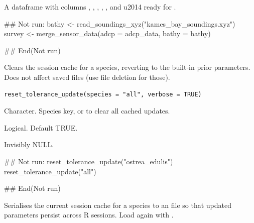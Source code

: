 \documentclass[a4paper]{book}
\begin{document}
%
\begin{Value}
A dataframe with columns , , , ,
, and  \bsl{}u2014 ready for .
\end{Value}
%
\begin{Examples}
\begin{ExampleCode}
## Not run: 
bathy <- read_soundings_xyz("kames_bay_soundings.xyz")
survey <- merge_sensor_data(adcp = adcp_data, bathy = bathy)

## End(Not run)
\end{ExampleCode}
\end{Examples}
%
\begin{Description}
Clears the session cache for a species, reverting to the built-in prior
parameters. Does not affect saved files (use file deletion for those).
\end{Description}
%
\begin{Usage}
\begin{verbatim}
reset_tolerance_update(species = "all", verbose = TRUE)
\end{verbatim}
\end{Usage}
%
\begin{Arguments}
\begin{ldescription}
\item[\code{species}] Character. Species key, or  to clear all cached updates.

\item[\code{verbose}] Logical. Default TRUE.
\end{ldescription}
\end{Arguments}
%
\begin{Value}
Invisibly NULL.
\end{Value}
%
\begin{Examples}
\begin{ExampleCode}
## Not run: 
reset_tolerance_update("ostrea_edulis")
reset_tolerance_update("all")

## End(Not run)
\end{ExampleCode}
\end{Examples}
%
\begin{Description}
Serialises the current session cache for a species to an  file so
that updated parameters persist across R sessions. Load again with
.
\end{Description}
\end{document}
